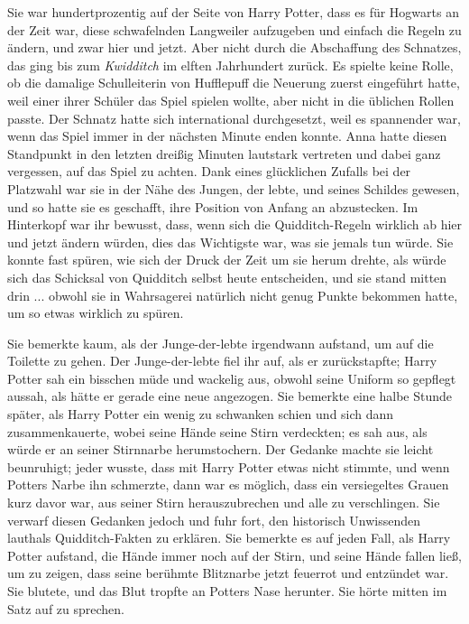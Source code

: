 Sie war hundertprozentig auf der Seite von Harry Potter, dass es für Hogwarts an
der Zeit war, diese schwafelnden Langweiler aufzugeben und einfach die Regeln zu
ändern, und zwar hier und jetzt. Aber nicht durch die Abschaffung des Schnatzes,
das ging bis zum \emph{Kwidditch} im elften Jahrhundert zurück. Es spielte keine
Rolle, ob die damalige Schulleiterin von Hufflepuff die Neuerung zuerst
eingeführt hatte, weil einer ihrer Schüler das Spiel spielen wollte, aber nicht
in die üblichen Rollen passte. Der Schnatz hatte sich international
durchgesetzt, weil es spannender war, wenn das Spiel immer in der nächsten
Minute enden konnte. Anna hatte diesen Standpunkt in den letzten dreißig Minuten
lautstark vertreten und dabei ganz vergessen, auf das Spiel zu achten. Dank
eines glücklichen Zufalls bei der Platzwahl war sie in der Nähe des Jungen, der
lebte, und seines Schildes gewesen, und so hatte sie es geschafft, ihre Position
von Anfang an abzustecken. Im Hinterkopf war ihr bewusst, dass, wenn sich die
Quidditch-Regeln wirklich ab hier und jetzt ändern würden, dies das Wichtigste
war, was sie jemals tun würde. Sie konnte fast spüren, wie sich der Druck der
Zeit um sie herum drehte, als würde sich das Schicksal von Quidditch selbst
heute entscheiden, und sie stand mitten drin ... obwohl sie in Wahrsagerei
natürlich nicht genug Punkte bekommen hatte, um so etwas wirklich zu spüren.

Sie bemerkte kaum, als der Junge-der-lebte irgendwann aufstand, um auf die
Toilette zu gehen. Der Junge-der-lebte fiel ihr auf, als er zurückstapfte; Harry
Potter sah ein bisschen müde und wackelig aus, obwohl seine Uniform so gepflegt
aussah, als hätte er gerade eine neue angezogen. Sie bemerkte eine halbe Stunde
später, als Harry Potter ein wenig zu schwanken schien und sich dann
zusammenkauerte, wobei seine Hände seine Stirn verdeckten; es sah aus, als würde
er an seiner Stirnnarbe herumstochern. Der Gedanke machte sie leicht beunruhigt;
jeder wusste, dass mit Harry Potter etwas nicht stimmte, und wenn Potters Narbe
ihn schmerzte, dann war es möglich, dass ein versiegeltes Grauen kurz davor war,
aus seiner Stirn herauszubrechen und alle zu verschlingen. Sie verwarf diesen
Gedanken jedoch und fuhr fort, den historisch Unwissenden lauthals
Quidditch-Fakten zu erklären. Sie bemerkte es auf jeden Fall, als Harry Potter
aufstand, die Hände immer noch auf der Stirn, und seine Hände fallen ließ, um zu
zeigen, dass seine berühmte Blitznarbe jetzt feuerrot und entzündet war. Sie
blutete, und das Blut tropfte an Potters Nase herunter. Sie hörte mitten im Satz
auf zu sprechen.

